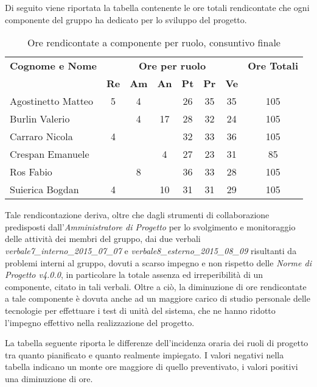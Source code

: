 Di seguito viene riportata la tabella contenente le ore totali rendicontate che ogni componente del gruppo ha dedicato per lo sviluppo del progetto.

\begin{table}[h]
	\centering
	\begin{tabular}{|l|c|c|c|c|c|c|c|}
		\toprule
		\textbf{Cognome e Nome} & \multicolumn{6}{c}{\textbf{Ore per ruolo}} & \textbf{Ore Totali} \\
		& \textbf{Re} & \textbf{Am} & \textbf{An} & \textbf{Pt} & \textbf{Pr} & \textbf{Ve} & \\
		
		\midrule
		Agostinetto Matteo & 5 & 4 & & 26 & 35 & 35 & 105 \\
		Burlin Valerio & & 4 & 17 & 28 & 32 & 24 & 105 \\ 
		Carraro Nicola & 4 & & & 32 & 33 & 36 & 105 \\
		Crespan Emanuele & & & 4 & 27 & 23 & 31 & 85 \\
		Ros Fabio & & 8 & & 36 & 33 & 28 & 105 \\
		Suierica Bogdan & 4 & & 10 & 31 & 31 & 29 & 105 \\
		
		\bottomrule
	\end{tabular}
	\caption{Ore rendicontate a componente per ruolo, consuntivo finale}
\end{table}

\noindent Tale rendicontazione deriva, oltre che dagli strumenti di collaborazione predisposti dall'\textit{Amministratore di Progetto} per lo svolgimento e monitoraggio delle attività dei membri del gruppo, dai due verbali \textit{verbale7\_interno\_2015\_07\_07} e \textit{verbale8\_esterno\_2015\_08\_09} risultanti da problemi interni al gruppo, dovuti a scarso impegno e non rispetto delle \textit{Norme di Progetto v4.0.0}, in particolare la totale assenza ed irreperibilità di un componente, citato in tali verbali. Oltre a ciò, la diminuzione di ore rendicontate a tale componente è dovuta anche ad un maggiore carico di studio personale delle tecnologie per effettuare i test di unità del sistema, che ne hanno ridotto l'impegno effettivo nella realizzazione del progetto. 

\noindent La tabella seguente riporta le differenze dell'incidenza oraria dei ruoli di progetto tra quanto pianificato e quanto realmente impiegato. I valori negativi nella tabella indicano un monte ore maggiore di quello preventivato, i valori positivi una diminuzione di ore.

